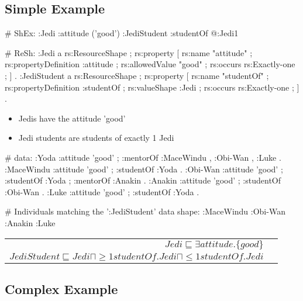 \documentclass{llncs}
\newenvironment{DL}{
  \vspace{0cm}
	\begin{center}
  \begin{tabular}{r l}

}{
  \end{tabular}
	\end{center}
}
\newcommand{\tb}[1]{\todo[size=\small, color=blue!40]{\textbf{Thomas:} #1}}
\begin{document}
\subsection{Simple Example}


\begin{ex}
# ShEx:
:Jedi {
    :attitude ('good') }
:JediStudent {
    :studentOf @:Jedi{1} }
\end{ex}

\begin{ex}
# ReSh:
:Jedi a rs:ResourceShape ;
    rs:property [
        rs:name "attitude" ;
        rs:propertyDefinition :attitude ;
        rs:allowedValue "good" ;
        rs:occurs rs:Exactly-one ;
    ] .
:JediStudent a rs:ResourceShape ;
    rs:property [
        rs:name "studentOf" ;
        rs:propertyDefinition :studentOf ;
        rs:valueShape :Jedi ;
        rs:occurs rs:Exactly-one ;
    ] .
\end{ex}

\begin{itemize}
	\item Jedis have the attitude 'good'
	\item Jedi students are students of exactly 1 Jedi
\end{itemize}

\begin{ex}
# data:
:Yoda 
    :attitude 'good' ;
    :mentorOf :MaceWindu , :Obi-Wan , :Luke .
:MaceWindu
    :attitude 'good' ;
    :studentOf :Yoda .
:Obi-Wan 
    :attitude 'good' ;
    :studentOf :Yoda ;
    :mentorOf :Anakin .
:Anakin
    :attitude 'good' ; 
    :studentOf :Obi-Wan .
:Luke
    :attitude 'good' ;
    :studentOf :Yoda .
\end{ex}

\begin{ex}
# Individuals matching the ’:JediStudent’ data shape:
:MaceWindu :Obi-Wan :Anakin :Luke
\end{ex}

\begin{DL}
$Jedi \sqsubseteq \exists attitude.\{good\} $\\
$JediStudent \sqsubseteq Jedi \sqcap \geq1 studentOf.Jedi \sqcap \leq1 studentOf.Jedi$ \\
\end{DL}

\subsection{Complex Example}
\end{document}
